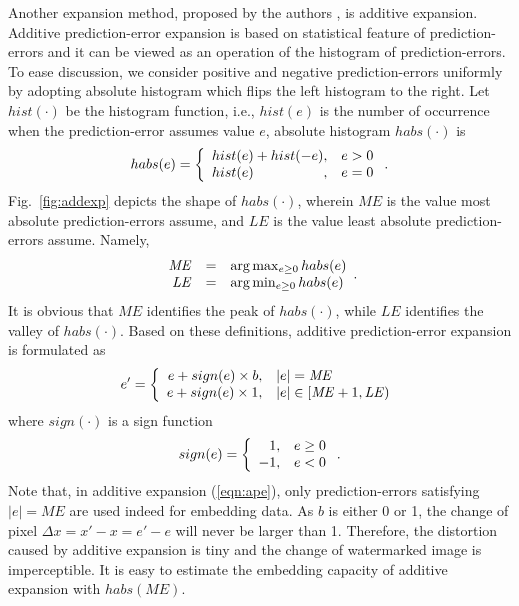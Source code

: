 \documentclass[journal]{IEEEtran}
\begin{document}
Another expansion method, proposed by the authors \cite{Chen09add}, is additive expansion.  Additive
prediction-error expansion is based on statistical feature of prediction-errors and it can be viewed
as an operation of the histogram of prediction-errors. To ease discussion, we consider positive and
negative prediction-errors uniformly by adopting absolute histogram which flips the left histogram
to the right. Let $hist(\cdot)$ be the histogram function, i.e., $hist(e)$ is the number of
occurrence when the prediction-error assumes value $e$, absolute histogram $habs(\cdot)$ is 
\begin{equation}
  habs(e) = \left\{ \begin{array}{l@{,\quad}l} 
    hist(e) + hist(-e) & e > 0 \\
    hist(e) & e = 0 \\
  \end{array} \right. . 
\end{equation}
Fig.\ \ref{fig:addexp} depicts the shape of $habs(\cdot)$, wherein $\mathit{ME}$ is the value most
absolute prediction-errors assume, and $\mathit{LE}$ is the value least absolute prediction-errors
assume. Namely,
\begin{equation}
    \begin{array}{r@{\quad=\quad}l}
      \mathit{ME} & \arg \max_{e\ge0} habs(e) \\
      \mathit{LE} & \arg \min_{e\ge0} habs(e)
    \end{array} .
\end{equation}
It is obvious that $\mathit{ME}$ identifies the peak of $habs(\cdot)$, while $\mathit{LE}$
identifies the valley of $habs(\cdot)$. Based on these definitions, additive prediction-error
expansion is formulated as 
\begin{equation}\label{eqn:ape}
 e' = \left\{ \begin{array}{r@{,\quad}l}
  e + sign(e) \times b & |e| = \mathit{ME} \\
  e + sign(e) \times 1 & |e| \in [\mathit{ME}+1,\mathit{LE}) \\
\end{array} \right. 
\end{equation}
where $sign(\cdot)$ is a sign function
\begin{equation}
  sign(e) = \left\{ \begin{array}{r@{,\quad}l} 
    1 & e \ge 0 \\ -1 & e < 0
  \end{array} \right. .
\end{equation}
Note that, in additive expansion (\ref{eqn:ape}), only prediction-errors satisfying
$|e|=\mathit{ME}$ are used indeed for embedding data. As $b$ is either 0 or 1, the change of pixel
$\Delta x = x' - x = e'-e$ will never be larger than 1. Therefore, the distortion caused by additive
expansion is tiny and the change of watermarked image is imperceptible. It is easy to estimate the
embedding capacity of additive expansion with $habs(\mathit{ME})$.
\end{document}
